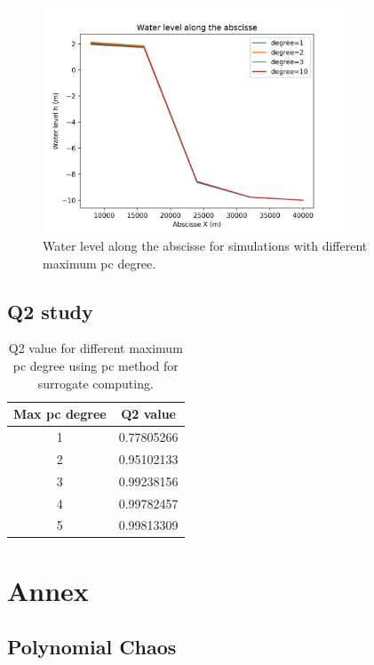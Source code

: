 \documentclass[hidelinks,12pt]{article}
\begin{document}
\begin{figure}
  \centering
  \includegraphics[width=0.8\textwidth]{images/influence_degree_method_surrogate_pc.png}
  \caption{Water level along the abscisse for simulations with different maximum pc degree.}
  	\label{influence_init_size_method_surrogate_kriging}
\end{figure}

\subsection{Q2 study}

\begin{table}
\begin{tabular}{|c|c|}
  \hline
  Max pc degree & Q2 value \\
  \hline
  1 & 0.77805266\\
  2 & 0.95102133\\
  3 & 0.99238156\\
  4 & 0.99782457\\
  5 & 0.99813309\\
  \hline
\end{tabular}
\caption{Q2 value for different maximum pc degree using pc method for surrogate computing.}
\end{table}




\section{Annex}

\subsection{Polynomial Chaos}

\subsection{}
\end{document}
